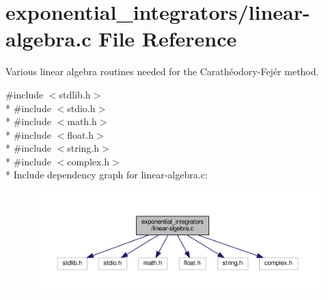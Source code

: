 \hypertarget{linear-algebra_8c}{}\section{exponential\+\_\+integrators/linear-\/algebra.c File Reference}
\label{linear-algebra_8c}


Various linear algebra routines needed for the Carathéodory-\/\+Fejér method.  


{\ttfamily \#include $<$stdlib.\+h$>$}\\*
{\ttfamily \#include $<$stdio.\+h$>$}\\*
{\ttfamily \#include $<$math.\+h$>$}\\*
{\ttfamily \#include $<$float.\+h$>$}\\*
{\ttfamily \#include $<$string.\+h$>$}\\*
{\ttfamily \#include $<$complex.\+h$>$}\\*
Include dependency graph for linear-\/algebra.c\+:\nopagebreak
\begin{figure}[H]
\begin{center}
\leavevmode
\includegraphics[width=350pt]{linear-algebra_8c__incl}
\end{center}
\end{figure}
